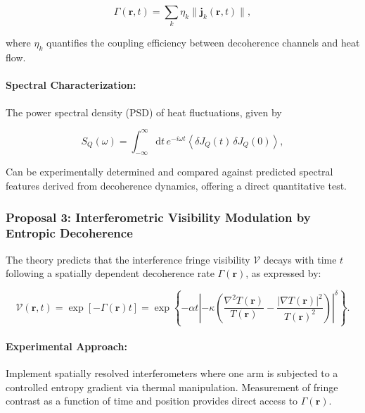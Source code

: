 \documentclass[12pt]{article}
\begin{document}
\begin{equation}
\Gamma(\mathbf{r}, t) = \sum_k \eta_k \| \mathbf{j}_k(\mathbf{r}, t) \|,
\label{eq:decoherence_heatflux_correlation}
\end{equation}

where \(\eta_k\) quantifies the coupling efficiency between decoherence channels and heat flow.

\paragraph{Spectral Characterization:} The power spectral density (PSD) of heat fluctuations, given by

\begin{equation}
S_Q(\omega) = \int_{-\infty}^\infty \mathrm{d}t \, e^{-i \omega t} \left\langle \delta J_Q(t) \, \delta J_Q(0) \right\rangle,
\label{eq:heat_flux_psd}
\end{equation}

Can be experimentally determined and compared against predicted spectral features derived from decoherence dynamics, offering a direct quantitative test.

\subsubsection*{Proposal 3: Interferometric Visibility Modulation by Entropic Decoherence}

The theory predicts that the interference fringe visibility \(\mathcal{V}\) decays with time \(t\) following a spatially dependent decoherence rate \(\Gamma(\mathbf{r})\), as expressed by:

\begin{equation}
\mathcal{V}(\mathbf{r}, t) = \exp \left[ - \Gamma(\mathbf{r}) t \right] = \exp \left\{ -\alpha t \left| -\kappa \left( \frac{\nabla^2 T(\mathbf{r})}{T(\mathbf{r})} - \frac{\left|\nabla T(\mathbf{r})\right|^2}{T(\mathbf{r})^2} \right) \right|^\delta \right\}.
\label{eq:visibility_decay_entropic}
\end{equation}

\paragraph{Experimental Approach:} Implement spatially resolved interferometers where one arm is subjected to a controlled entropy gradient via thermal manipulation. Measurement of fringe contrast as a function of time and position provides direct access to \(\Gamma(\mathbf{r})\).
\end{document}
